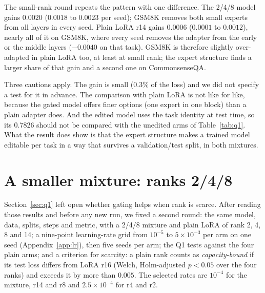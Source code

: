 \documentclass[11pt]{article}
\begin{document}
The small-rank round repeats the pattern with one difference. The 2/4/8 model gains $0.0020$
($0.0018$ to $0.0023$ per seed); GSM8K removes both small experts from all layers in every seed.
Plain LoRA r14 gains $0.0006$ ($0.0001$ to $0.0012$), nearly all of it on GSM8K, where every seed
removes the adapter from the early or the middle layers ($-0.0040$ on that task). GSM8K is
therefore slightly over-adapted in plain LoRA too, at least at small rank; the expert structure
finds a larger share of that gain and a second one on CommonsenseQA.

Three cautions apply. The gain is small ($0.3\%$ of the loss) and we did not specify a test for
it in advance. The comparison with plain LoRA is not like for like, because the gated model
offers finer options (one expert in one block) than a plain adapter does. And the edited model
uses the task identity at test time, so its $0.7826$ should not be compared with the unedited
arms of Table~\ref{tab:q1}. What the result does show is that the expert structure makes a
trained model editable per task in a way that survives a validation/test split, in both
mixtures.

\section{A smaller mixture: ranks 2/4/8}
\label{sec:small}
Section~\ref{sec:q1} left open whether gating helps when rank is scarce. After reading those
results and before any new run, we fixed a second round: the same model, data, splits, steps and
metric, with a 2/4/8 mixture and plain LoRA of rank 2, 4, 8 and 14; a nine-point learning-rate
grid from $10^{-5}$ to $5\times10^{-3}$ per arm on one seed (Appendix~\ref{app:lr}), then five
seeds per arm; the Q1 tests against the four plain arms; and a criterion for scarcity: a plain
rank counts as \emph{capacity-bound} if its test loss differs from LoRA r16 (Welch,
Holm-adjusted $p<0.05$ over the four ranks) and exceeds it by more than $0.005$. The selected
rates are $10^{-4}$ for the mixture, r14 and r8 and $2.5\times10^{-4}$ for r4 and r2.
\end{document}
